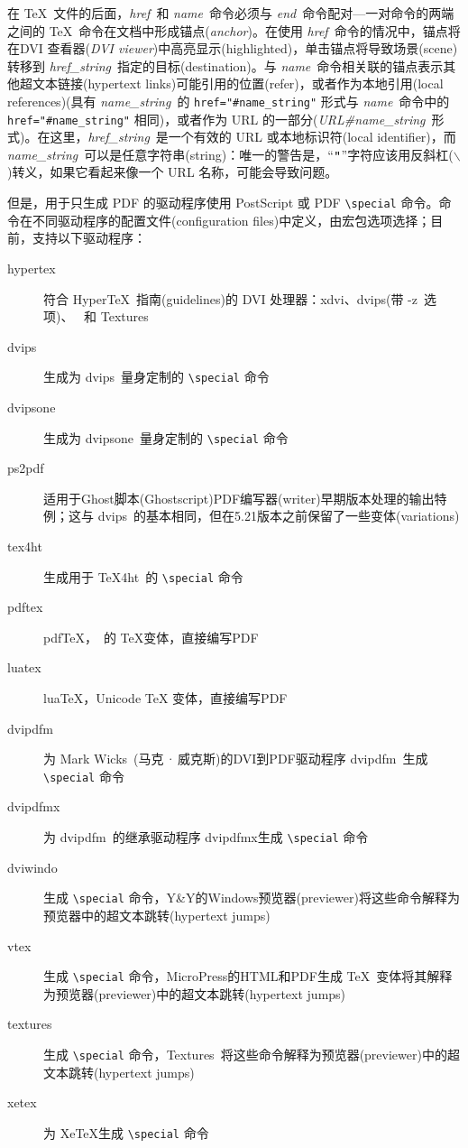 \documentclass{article}
\begin{document}
在 \TeX\ 文件的后面，\emph{href}\ 和 \emph{name}\ 命令必须与 \emph{end}\ 命令配对---一对命令的两端之间的 \TeX\ 命令在文档中形成{\kaiti 锚点}(\emph{anchor})。在使用 \emph{href}\ 命令的情况中，{\kaiti 锚点}将在{\kaiti DVI 查看器}(\emph{DVI viewer})中高亮显示(highlighted)，单击{\kaiti 锚点}将导致场景(scene)转移到 \emph{href\_string}\ 指定的目标(destination)。与 \emph{name}\ 命令相关联的{\kaiti 锚点}表示其他超文本链接(hypertext links)可能引用的位置(refer)，或者作为本地引用(local references)(具有 \emph{name\_string}\ 的 \verb|href="#name_string"| 形式与 \emph{name}\ 命令中的 \verb|href="#name_string"| 相同)，或者作为 URL 的一部分(\emph{URL\#name\_string}\ 形式)。在这里，\emph{href\_string}\ 是一个有效的 URL 或本地标识符(local identifier)，而 \emph{name\_string}\ 可以是任意字符串(string)：唯一的警告是，“$\verb|"|$”字符应该用反斜杠($\backslash$)转义，如果它看起来像一个 URL 名称，可能会导致问题。

但是，用于{\kaiti 只}生成 PDF 的驱动程序使用 PostScript 或 PDF \verb|\special| 命令。命令在不同驱动程序的配置文件(configuration files)中定义，由宏包选项选择；目前，支持以下驱动程序：

\begin{description}
  \item[hypertex] 符合 Hyper\TeX\ 指南(guidelines)的 DVI 处理器：\textsf{xdvi}、\textsf{dvips}(带 \textsf{-z}\ 选项)、 \textsf{}\ 和 \textsf{Textures}
  \item[dvips] 生成为 \textsf{dvips}\ 量身定制的 \verb|\special| 命令
  \item[dvipsone] 生成为 \textsf{dvipsone}\ 量身定制的 \verb|\special| 命令
  \item[ps2pdf] 适用于Ghost脚本(Ghost\-script)PDF编写器(writer)早期版本处理的输出特例；这与 \textsf{dvips}\ 的基本相同，但在5.21版本之前保留了一些变体(variations)
  \item[tex4ht] 生成用于 \textsf{\TeX4ht}\ 的 \verb|\special| 命令
  \item[pdftex] pdf\TeX，\ 的 \TeX{}变体，直接编写PDF
  \item[luatex] lua\TeX，Unicode \TeX{} 变体，直接编写PDF
  \item[dvipdfm] 为 Mark Wicks~(马克\,·\,威克斯)的DVI到PDF驱动程序 \textsf{dvipdfm}\ 生成 \verb|\special| 命令
  \item[dvipdfmx] 为 \textsf{dvipdfm}\ 的继承驱动程序 \textsf{dvipdfmx}生成 \verb|\special| 命令
  \item[dviwindo] 生成 \verb|\special| 命令，Y\&Y的Windows预览器(previewer)将这些命令解释为预览器中的超文本跳转(hypertext jumps)
  \item[vtex] 生成 \verb|\special| 命令，MicroPress的HTML和PDF生成 \TeX\ 变体将其解释为预览器(previewer)中的超文本跳转(hypertext jumps)
  \item[textures] 生成 \verb|\special| 命令，\textsf{Textures}\ 将这些命令解释为预览器(previewer)中的超文本跳转(hypertext jumps)
  \item[xetex] 为 Xe\TeX{}生成 \verb|\special| 命令
\end{description}
\end{document}
